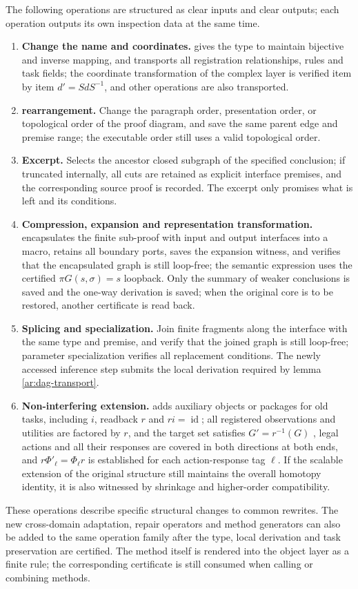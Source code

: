 \documentclass[11pt,a4paper]{article}
\theoremstyle{plain}
\theoremstyle{definition}
\theoremstyle{remark}
\begin{document}
\begin{CJK*}
The following operations are structured as clear inputs and clear outputs; each operation outputs its own inspection data at the same time.\begin{enumerate}
[label=\arabic*.]\item
\textbf { Change the name and coordinates. } gives the type to maintain bijective and inverse mapping, and transports all registration relationships, rules and task fields; the coordinate transformation of the complex layer is verified item by item $d'=SdS^{-1}$, and other operations are also transported.\item
\textbf { rearrangement. } Change the paragraph order, presentation order, or topological order of the proof diagram, and save the same parent edge and premise range; the executable order still uses a valid topological order.\item
\textbf { Excerpt. } Selects the ancestor closed subgraph of the specified conclusion; if truncated internally, all cuts are retained as explicit interface premises, and the corresponding source proof is recorded. The excerpt only promises what is left and its conditions.\item
\textbf { Compression, expansion and representation transformation. } encapsulates the finite sub-proof with input and output interfaces into a macro, retains all boundary ports, saves the expansion witness, and verifies that the encapsulated graph is still loop-free; the semantic expression uses the certified $\pi G(s,\sigma)=s$ loopback. Only the summary of weaker conclusions is saved and the one-way derivation is saved; when the original core is to be restored, another certificate is read back.\item
\textbf { Splicing and specialization. } Join finite fragments along the interface with the same type and premise, and verify that the joined graph is still loop-free; parameter specialization verifies all replacement conditions. The newly accessed inference step submits the local derivation required by lemma ~ \ref{ar:dag-transport}.\item
\textbf { Non-interfering extension. } adds auxiliary objects or packages for old tasks, including $i$, readback $r$ and $ri=\operatorname{id}$; all registered observations and utilities are factored by $r$, and the target set satisfies $G'=r^{-1}(G)$ , legal actions and all their responses are covered in both directions at both ends, and $r\Phi'_\ell=\Phi_\ell r$ is established for each action-response tag $\ell$. If the scalable extension of the original structure still maintains the overall homotopy identity, it is also witnessed by shrinkage and higher-order compatibility.\end{enumerate}
These operations describe specific structural changes to common rewrites. The new cross-domain adaptation, repair operators and method generators can also be added to the same operation family after the type, local derivation and task preservation are certified. The method itself is rendered into the object layer as a finite rule; the corresponding certificate is still consumed when calling or combining methods. \cite{S04,S09,S10,S12,S13,S38}


\end{CJK*}
\end{document}
